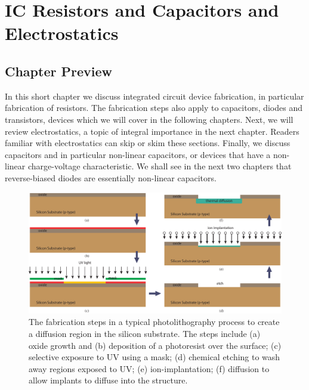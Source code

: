 \chapter{IC Resistors and Capacitors and Electrostatics}
\label{ch:ch04_ic_tech}
\graphicspath{{./figs_ic_tech/}}
\section{Chapter Preview}
In this short chapter we discuss integrated circuit device fabrication, in particular fabrication of resistors.  The fabrication steps also apply to capacitors, diodes and transistors, devices which we will cover in the following chapters.  Next, we will review electrostatics, a topic of integral importance in the next chapter.  Readers familiar with electrostatics can skip or skim these sections.  Finally, we discuss capacitors and in particular non-linear capacitors, or devices that have a non-linear charge-voltage characteristic.  We shall see in the next two chapters that reverse-biased diodes are essentially non-linear capacitors.
\newpage
\begin{figure}[t]
\centering
\includegraphics[width=\columnwidth]{process_steps}
\caption{The fabrication steps in a typical photolithography process to create a diffusion region in the silicon substrate.  The steps include (a) oxide growth and (b) deposition of a photoresist over the surface; (c) selective exposure to UV using a mask; (d) chemical etching to wash away regions exposed to UV; (e) ion-implantation; (f) diffusion to allow implants to diffuse into the structure.} \label{fig:mod2-2_ICtech_sld_4}
\end{figure}
